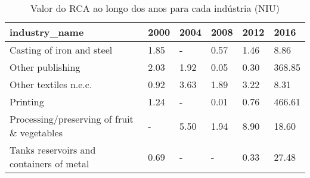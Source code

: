 \begin{table}
\centering
\caption{Valor do RCA ao longo dos anos para cada indústria (NIU)}
\begin{tabular}{p{6cm}p{1.5cm}p{1.5cm}p{1.5cm}p{1.5cm}p{1.5cm}}
\toprule
                              industry\_name & 2000 & 2004 & 2008 & 2012 &   2016 \\
\midrule
                  Casting of iron and steel & 1.85 &    - & 0.57 & 1.46 &   8.86 \\
                           Other publishing & 2.03 & 1.92 & 0.05 & 0.30 & 368.85 \\
                      Other textiles n.e.c. & 0.92 & 3.63 & 1.89 & 3.22 &   8.31 \\
                                   Printing & 1.24 &    - & 0.01 & 0.76 & 466.61 \\
Processing/preserving of fruit \& vegetables &    - & 5.50 & 1.94 & 8.90 &  18.60 \\
   Tanks reservoirs and containers of metal & 0.69 &    - &    - & 0.33 &  27.48 \\
\bottomrule
\end{tabular}
\end{table}
